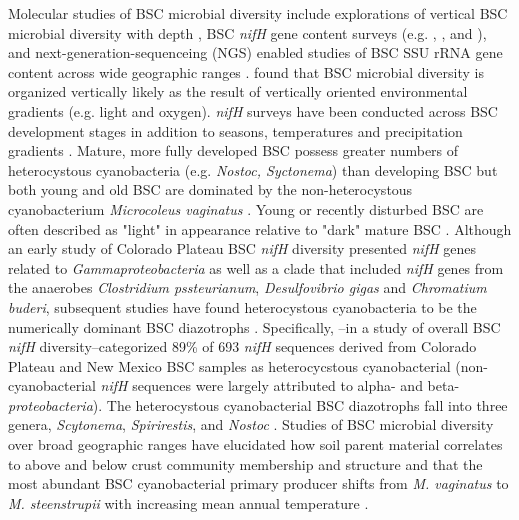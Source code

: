 Molecular studies of BSC microbial diversity include explorations of vertical BSC microbial diversity with depth \cite{Garcia_Pichel_2003}, BSC \textit{nifH} gene content surveys (e.g. \citet{14766579}, \citet{Yeager_2012}, \citet{Yeager} and \citet{Steppe_1996}), and next-generation-sequenceing (NGS) enabled studies of BSC SSU rRNA gene content across wide geographic ranges \cite{Garcia_Pichel_2013, Steven_2013}. \citet{Garcia_Pichel_2003} found that BSC microbial diversity is organized vertically likely as the result of vertically oriented environmental gradients (e.g. light and oxygen). \textit{nifH} surveys have been conducted across BSC development stages \cite{14766579} in addition to seasons, temperatures and precipitation gradients \cite{Yeager_2012}. Mature, more fully developed BSC possess greater numbers of heterocystous cyanobacteria (e.g. \textit{Nostoc, Syctonema}) than developing BSC but both young and old BSC are dominated by the non-heterocystous cyanobacterium \textit{Microcoleus vaginatus} \cite{14766579}. Young or recently disturbed BSC are often described as "light" in appearance relative to "dark" mature BSC \cite{Belnap_2002}.  Although an early study of Colorado Plateau BSC \textit{nifH} diversity presented \textit{nifH} genes related to \textit{Gammaproteobacteria} as well as a clade that included \textit{nifH} genes from the anaerobes \textit{Clostridium pssteurianum}, \textit{Desulfovibrio gigas} and \textit{Chromatium buderi}, subsequent studies have found heterocystous cyanobacteria to be the numerically dominant BSC diazotrophs \cite{Yeager, 14766579, Yeager_2012}. Specifically, \citet{Yeager}--in a study of overall BSC \textit{nifH} diversity--categorized 89\% of 693 \textit{nifH} sequences derived from Colorado Plateau and New Mexico BSC samples as heterocycstous cyanobacterial (non-cyanobacterial \textit{nifH} sequences were largely attributed to alpha- and beta- \textit{proteobacteria}). The heterocystous cyanobacterial BSC diazotrophs fall into three genera, \textit{Scytonema}, \textit{Spirirestis}, and \textit{Nostoc} \cite{Yeager, Yeager_2012}. Studies of BSC microbial diversity over broad geographic ranges have elucidated how soil parent material correlates to above and below crust community membership and structure \cite{Steven_2013} and that the most abundant BSC cyanobacterial primary producer shifts from \textit{M. vaginatus} to \textit{M. steenstrupii} with increasing mean annual temperature \cite{Garcia_Pichel_2013}.

